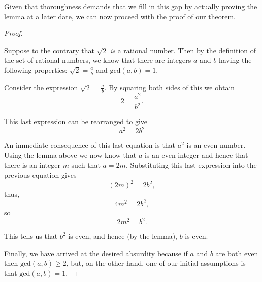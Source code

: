 \documentclass[10pt,]{book}
\theoremstyle{plain}
\theoremstyle{definition}
\theoremstyle{definition}
\numberwithin{equation}{section}
\renewcommand{\gcd}[2]{\mbox{gcd} (#1, #2)}
\begin{document}
    Given that thoroughness demands that we fill in this gap by actually
    proving the lemma at a later date, we can now proceed with the proof
    of our theorem.
\begin{proof}\hypertarget{proof-1}{}

      Suppose to the contrary that \(\sqrt{2}\) \emph{is} a rational number.
      Then by the definition of the set of rational numbers, we know that
      there are integers
      \(a\) and \(b\) having the following properties:
      \(\displaystyle \sqrt{2} = \frac{a}{b}\) and \(\gcd{a}{b} = 1\).
\par

      Consider the expression \(\displaystyle \sqrt{2} = \frac{a}{b}\).
      By squaring both sides of this we obtain
      \begin{equation*}
        2 = \frac{a^2}{b^2}.
      \end{equation*}
\par

      This last expression can be rearranged to give
      \begin{equation*}
        a^2 = 2 b^2
      \end{equation*}
\par

      An immediate consequence of this last equation is that \(a^2\) is an
      even number. Using the lemma above we now know that \(a\) is an even
      integer and hence that there is an integer \(m\) such that \(a=2m\).
      Substituting this last expression into the previous equation gives
      \begin{equation*}
        (2m)^2 = 2 b^2,
      \end{equation*}
      thus,
      \begin{equation*}
        4m^2 = 2 b^2,
      \end{equation*}
      so
      \begin{equation*}
        2m^2 = b^2.
      \end{equation*}
\par

      This tells us that \(b^2\) is even, and hence (by the lemma), \(b\) is even.
\par

      Finally, we have arrived at the desired absurdity because if \(a\) and
      \(b\) are both even then \(\gcd{a}{b} \geq 2\), but, on the other hand,
      one of our initial assumptions is that \(\gcd{a}{b} = 1\).
\end{proof}
\typeout{************************************************}
\typeout{************************************************}
\end{document}
